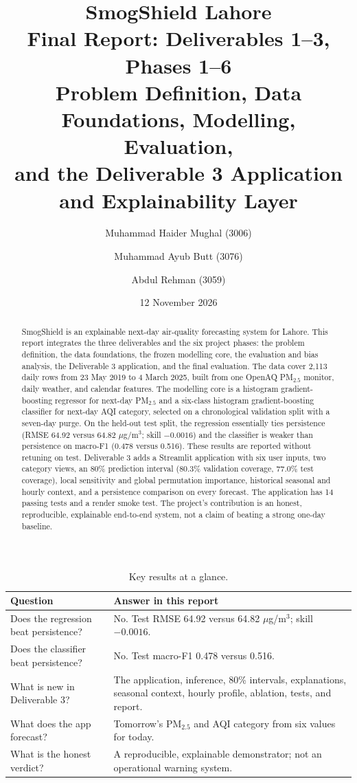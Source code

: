 \documentclass[11pt]{article}
\title{\textbf{SmogShield Lahore}\\[3mm]
Final Report: Deliverables 1--3, Phases 1--6\\[2mm]
\large Problem Definition, Data Foundations, Modelling, Evaluation,\\
\large and the Deliverable 3 Application and Explainability Layer}
\author{Muhammad Haider Mughal (3006) \and Muhammad Ayub Butt (3076) \and Abdul Rehman (3059)}
\date{12 November 2026}
\renewcommand{\arraystretch}{1.12}
\begin{document}
\maketitle
\thispagestyle{empty}

\begin{abstract}
\noindent
SmogShield is an explainable next-day air-quality forecasting system for
Lahore. This report integrates the three deliverables and the six project
phases: the problem definition, the data foundations, the frozen modelling
core, the evaluation and bias analysis, the Deliverable 3 application, and the
final evaluation. The data cover 2,113 daily rows from 23 May 2019 to 4 March
2025, built from one OpenAQ PM$_{2.5}$ monitor, daily weather, and calendar
features. The modelling core is a histogram gradient-boosting regressor for
next-day PM$_{2.5}$ and a six-class histogram gradient-boosting classifier for
next-day AQI category, selected on a chronological validation split with a
seven-day purge. On the held-out test split, the regression essentially ties
persistence (RMSE 64.92 versus 64.82 $\mu$g/m$^3$; skill $-0.0016$) and the
classifier is weaker than persistence on macro-F1 (0.478 versus 0.516). These
results are reported without retuning on test. Deliverable 3 adds a Streamlit
application with six user inputs, two category views, an 80\% prediction
interval (80.3\% validation coverage, 77.0\% test coverage), local sensitivity
and global permutation importance, historical seasonal and hourly context, and
a persistence comparison on every forecast. The application has 14 passing
tests and a render smoke test. The project's contribution is an honest,
reproducible, explainable end-to-end system, not a claim of beating a strong
one-day baseline.
\end{abstract}

\vspace{2mm}
\begin{table}[htbp]
\centering
\small
\renewcommand{\arraystretch}{1.25}
\begin{tabular}{@{}L{6.6cm}L{7.4cm}@{}}
\toprule
\textbf{Question} & \textbf{Answer in this report} \\
\midrule
Does the regression beat persistence? &
No. Test RMSE 64.92 versus 64.82 $\mu$g/m$^3$; skill $-0.0016$. \\
Does the classifier beat persistence? &
No. Test macro-F1 0.478 versus 0.516. \\
What is new in Deliverable 3? &
The application, inference, 80\% intervals, explanations, seasonal context,
hourly profile, ablation, tests, and report. \\
What does the app forecast? &
Tomorrow's PM$_{2.5}$ and AQI category from six values for today. \\
What is the honest verdict? &
A reproducible, explainable demonstrator; not an operational warning system. \\
\bottomrule
\end{tabular}
\caption{Key results at a glance.}
\label{tab:glance}
\end{table}
\end{document}
